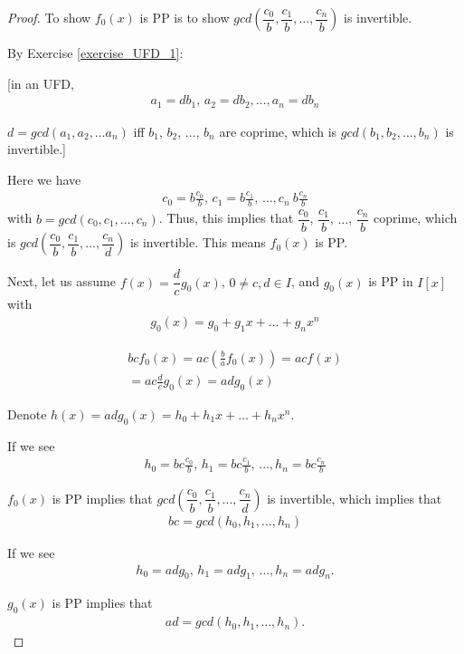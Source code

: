 \documentclass[utf8]{ctexbook}
\begin{document}
\begin{proof}
To show $f_0(x)$ is PP is to show $
gcd(\dfrac{c_0}{b} , \dfrac{c_1}{b} , \ldots , \dfrac{c_n}{b})$ is invertible.

By Exercise \ref{exercise_UFD_1}: 

[in an UFD, 
\begin{align*}
a_1 = d b_1, \, a_2 = d b_2, \ldots, a_n = d b_n
\end{align*}

$d = gcd(a_1, a_2, \ldots a_n)$ iff $b_1$, $b_2$, $\ldots$, $b_n$ are coprime, which is $gcd(b_1, b_2, \ldots, b_n)$ is invertible.]

Here we have
\begin{align*}
c_0 = b \frac{c_0}{b}, \, c_1 = b \frac{c_1}{b}, \, \ldots, c_n \ b \frac{c_n}{b}
\end{align*}
with $b = gcd(c_0, c_1, \ldots, c_n)$. Thus, this implies that $\dfrac{c_0}{b}$, $\dfrac{c_1}{b}$, $\ldots$, $\dfrac{c_n}{b}$ coprime, which is $gcd(\dfrac{c_0}{b}, \dfrac{c_1}{b}, \ldots, \dfrac{c_n}{d})$ is invertible. This means $f_0 (x)$ is PP.

Next, let us assume $f(x) = \dfrac{d}{c} g_0 (x)$, $0 \neq c, d\in I$, and $g_0 (x)$ is PP in $I[x]$ with
\begin{align*}
g_0 (x) = g_0 + g_1 x + \ldots + g_n x^n
\end{align*}

\begin{align*}
bc f_0 (x) = ac (\frac{b}{a} f_0 (x) ) = ac f (x) \\
= ac \frac{d}{c} g_0 (x) = ad g_0 (x)
\end{align*}

Denote $h(x) = a d g_0 (x) = h_0 + h_1 x + \ldots + h_n x^n$.

If we see
\begin{align*}
h_0 = bc \frac{c_0}{b}, \, h_1 = bc \frac{c_1}{b}, \, \ldots, h_n = bc \frac{c_n}{b}
\end{align*}

$f_0(x)$ is PP implies that $gcd(\dfrac{c_0}{b}, \dfrac{c_1}{b}, \ldots, \dfrac{c_n}{d})$ is invertible, which implies that
\begin{align*}
bc = gcd(h_0, h_1, \ldots, h_n)
\end{align*}

If we see
\begin{align*}
h_0 = ad g_0, \, h_1 = ad g_1, \, \ldots, h_n = ad g_n .
\end{align*}

$g_0 (x)$ is PP implies that
\begin{align*}
ad = gcd(h_0, h_1, \ldots, h_n) .
\end{align*} 


\end{proof}
\end{document}
